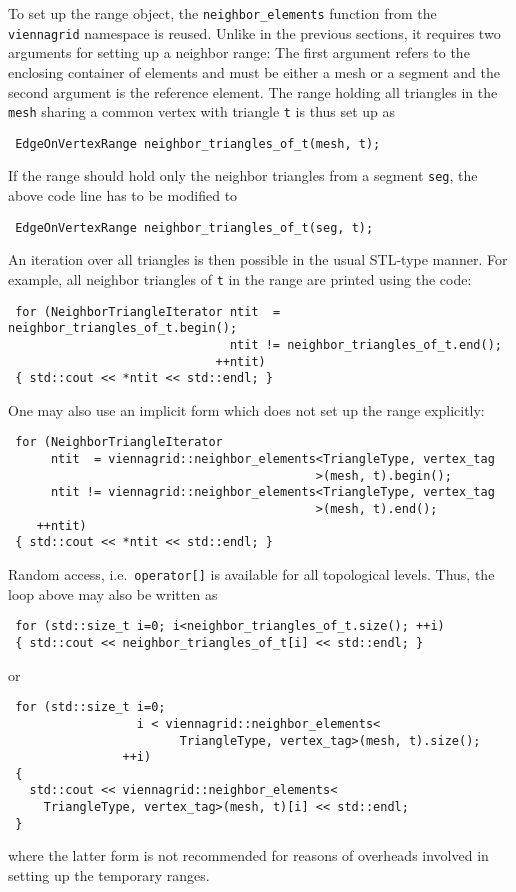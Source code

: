 To set up the range object, the \lstinline|neighbor_elements| function from the \lstinline|viennagrid| namespace is reused. Unlike in the previous sections, it requires two arguments
for setting up a neighbor range: The first argument refers to the enclosing container of elements and must be either a mesh or a segment and the second argument is the reference element.
The range holding all triangles in the \lstinline|mesh| sharing a common vertex with triangle \lstinline|t| is thus set up as
\begin{lstlisting}
 EdgeOnVertexRange neighbor_triangles_of_t(mesh, t);
\end{lstlisting}
If the range should hold only the neighbor triangles from a segment \lstinline|seg|, the above code line has to be modified to
\begin{lstlisting}
 EdgeOnVertexRange neighbor_triangles_of_t(seg, t);
\end{lstlisting}
An iteration over all triangles is then possible in the usual STL-type manner. For example, all neighbor triangles of \lstinline|t| in the range are printed using the code:
\begin{lstlisting}
 for (NeighborTriangleIterator ntit  = neighbor_triangles_of_t.begin();
                               ntit != neighbor_triangles_of_t.end();
                             ++ntit)
 { std::cout << *ntit << std::endl; }
\end{lstlisting}


One may also use an implicit form which does not set up the range explicitly:
\begin{lstlisting}
 for (NeighborTriangleIterator
      ntit  = viennagrid::neighbor_elements<TriangleType, vertex_tag
                                           >(mesh, t).begin();
      ntit != viennagrid::neighbor_elements<TriangleType, vertex_tag
                                           >(mesh, t).end();
    ++ntit)
 { std::cout << *ntit << std::endl; }
\end{lstlisting}

Random access, i.e.~\lstinline|operator[]| is available for all topological levels. Thus, the loop above may also be written as
\begin{lstlisting}
 for (std::size_t i=0; i<neighbor_triangles_of_t.size(); ++i)
 { std::cout << neighbor_triangles_of_t[i] << std::endl; }
\end{lstlisting}
or
\begin{lstlisting}
 for (std::size_t i=0;
                  i < viennagrid::neighbor_elements<
                        TriangleType, vertex_tag>(mesh, t).size();
                ++i)
 {
   std::cout << viennagrid::neighbor_elements<
     TriangleType, vertex_tag>(mesh, t)[i] << std::endl;
 }
\end{lstlisting}
where the latter form is not recommended for reasons of overheads involved in setting up the temporary ranges.

